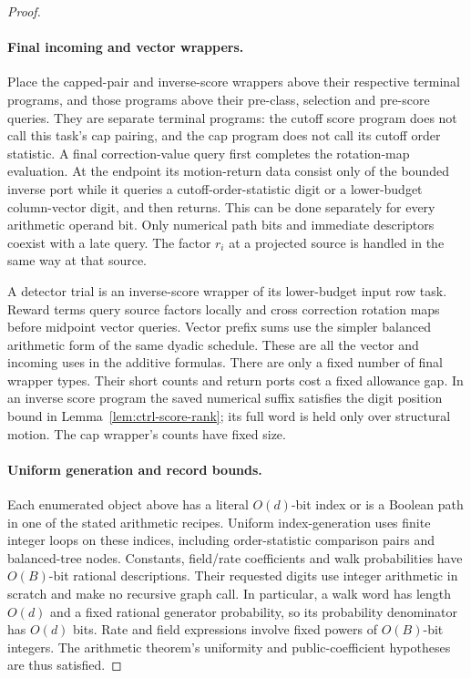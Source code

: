\begin{proof}
\paragraph{Final incoming and vector wrappers.}
Place the capped-pair and inverse-score wrappers above their respective
terminal programs, and those programs above their pre-class, selection
and pre-score queries.  They are separate terminal programs: the cutoff
score program does not call this task's cap pairing, and the cap
program does not call its cutoff order statistic.  A final correction-value query
first completes the rotation-map evaluation.  At the endpoint its motion-return data consist only of the
bounded inverse port while it queries a cutoff-order-statistic digit or a lower-budget
column-vector digit, and then returns.  This can be done separately for
every arithmetic operand bit.  Only numerical path bits and immediate
descriptors coexist with a late query.  The factor $r_i$ at a projected
source is handled in the same way at that source.

A detector trial is an inverse-score wrapper of its lower-budget
input row task.  Reward terms query source factors locally and cross
correction rotation maps before midpoint vector queries.  Vector prefix sums
use the simpler balanced arithmetic form of the same dyadic schedule.
These are all the vector and incoming uses in the additive formulas.
There are only a fixed number of final wrapper types.  Their short
counts and return ports cost a fixed allowance gap.  In an inverse
score program the saved numerical suffix satisfies the digit position bound in
Lemma~\ref{lem:ctrl-score-rank}; its full word is held only over
structural motion.  The cap wrapper's counts have fixed size.

\paragraph{Uniform generation and record bounds.}
Each enumerated object above has a literal $O(d)$-bit index or is a
Boolean path in one of the stated arithmetic recipes.  Uniform
index-generation uses finite integer loops on these indices, including
order-statistic comparison pairs and balanced-tree nodes.  Constants, field/rate
coefficients and walk probabilities have $O(B)$-bit rational
descriptions.  Their requested digits use integer arithmetic in scratch
and make no recursive graph call.  In particular, a walk word has
length $O(d)$ and a fixed rational generator probability, so its
probability denominator has $O(d)$ bits.  Rate and field expressions
involve fixed powers of $O(B)$-bit integers.  The arithmetic theorem's
uniformity and public-coefficient hypotheses are thus satisfied.


\end{proof}
